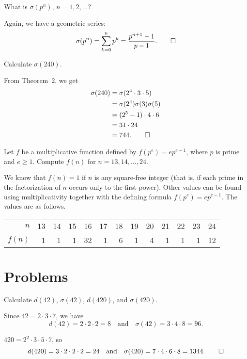  What is $\sigma(p^n)$, $n = 1, 2, \dots$?
\begin{solution}
  Again, we have a geometric series:
  \begin{equation*}
    \sigma(p^n) = \sum_{k=0}^np^k = \frac{p^{n+1} - 1}{p - 1}.
    \qedhere
  \end{equation*}
\end{solution}

 Calculate $\sigma(240)$.
\begin{solution}
  From Theorem~2, we get
  \begin{align*}
    \sigma(240) &= \sigma(2^4\cdot3\cdot5) \\
                &= \sigma(2^4)\sigma(3)\sigma(5) \\
                &= (2^5 - 1)\cdot4\cdot6 \\
                &= 31\cdot24 \\
                &= 744. \qedhere
  \end{align*}
\end{solution}

 Let $f$ be a multiplicative function defined by
$f(p^e) = ep^{e-1}$, where $p$ is prime and $e\geq1$. Compute $f(n)$
for $n = 13, 14, \dots, 24$.
\begin{solution}
  We know that $f(n) = 1$ if $n$ is any square-free integer (that is,
  if each prime in the factorization of $n$ occurs only to the first
  power). Other values can be found using multiplicativity together
  with the defining formula $f(p^e) = ep^{e-1}$. The values are as
  follows.
  \begin{center}
    \begin{tabular}{r|rrrrrrrrrrrr}
      $n$ & 13 & 14 & 15 & 16 & 17 & 18 & 19 & 20 & 21 & 22 & 23 & 24 \\
      $f(n)$ & 1 & 1 & 1 & 32 & 1 & 6 & 1 & 4 & 1 & 1 & 1 & 12
    \end{tabular}
  \end{center}
\end{solution}

\section{Problems}

 Calculate $d(42)$, $\sigma(42)$, $d(420)$, and
$\sigma(420)$.
\begin{solution}
  Since $42 = 2\cdot3\cdot7$, we have
  \begin{equation*}
    d(42) = 2\cdot2\cdot2 = 8
    \quad\text{and}\quad
    \sigma(42) = 3\cdot4\cdot8 = 96.
  \end{equation*}

  $420 = 2^2\cdot3\cdot5\cdot7$, so
  \begin{equation*}
    d(420) = 3\cdot2\cdot2\cdot2 = 24
    \quad\text{and}\quad
    \sigma(420) = 7\cdot4\cdot6\cdot8 = 1344. \qedhere
  \end{equation*}
\end{solution}

